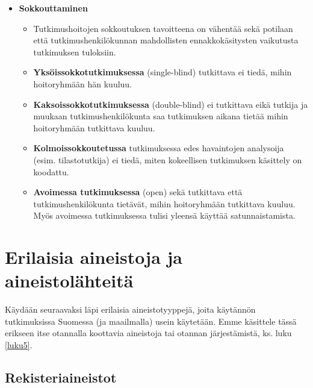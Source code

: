\documentclass[
]{book}
\providecommand{\tightlist}{%
  \setlength{\itemsep}{0pt}\setlength{\parskip}{0pt}}
\begin{document}
\begin{itemize}
\tightlist
\item
  \textbf{Sokkouttaminen}

  \begin{itemize}
  \tightlist
  \item
    Tutkimushoitojen sokkoutuksen tavoitteena on vähentää sekä potilaan että tutkimushenkilökunnan mahdollisten ennakkokäsitysten vaikutusta tutkimuksen tuloksiin.
  \item
    \textbf{Yksöissokkotutkimuksessa} (single-blind) tutkittava ei tiedä, mihin hoitoryhmään hän kuuluu.
  \item
    \textbf{Kaksoissokkotutkimuksessa} (double-blind) ei tutkittava eikä tutkija ja muukaan tutkimushenkilökunta saa tutkimuksen aikana tietää mihin hoitoryhmään tutkittava kuuluu.
  \item
    \textbf{Kolmoissokkoutetussa} tutkimuksessa edes havaintojen analysoija (esim. tilastotutkija) ei tiedä, miten kokeellisen tutkimuksen käsittely on koodattu.
  \item
    \textbf{Avoimessa tutkimuksessa} (open) sekä tutkittava että tutkimushenkilökunta tietävät, mihin hoitoryhmään tutkittava kuuluu. Myös avoimessa tutkimuksessa tulisi yleensä käyttää satunnaistamista.
  \end{itemize}
\end{itemize}

\hypertarget{alaluku123}{%
\section{Erilaisia aineistoja ja aineistolähteitä}\label{alaluku123}}

Käydään seuraavaksi läpi erilaisia aineistotyyppejä, joita käytännön tutkimuksissa Suomessa (ja maailmalla) usein käytetään. Emme käsittele tässä erikseen itse otannalla koottavia aineistoja tai otannan järjestämistä, ks. luku \ref{luku5}.

\hypertarget{rekisteriaineistot}{%
\subsection{Rekisteriaineistot}\label{rekisteriaineistot}}
\end{document}
